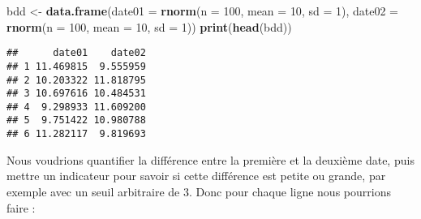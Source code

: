 \documentclass[]{book}
\newenvironment{Shaded}{\begin{snugshade}}{\end{snugshade}}
\newcommand{\KeywordTok}[1]{\textcolor[rgb]{0.13,0.29,0.53}{\textbf{#1}}}
\newcommand{\DataTypeTok}[1]{\textcolor[rgb]{0.13,0.29,0.53}{#1}}
\newcommand{\DecValTok}[1]{\textcolor[rgb]{0.00,0.00,0.81}{#1}}
\newcommand{\StringTok}[1]{\textcolor[rgb]{0.31,0.60,0.02}{#1}}
\newcommand{\NormalTok}[1]{#1}
\theoremstyle{definition}
\theoremstyle{definition}
\theoremstyle{definition}
\theoremstyle{remark}
\begin{document}
\begin{Shaded}
\begin{Highlighting}[]
\NormalTok{bdd <-}\StringTok{ }\KeywordTok{data.frame}\NormalTok{(}\DataTypeTok{date01 =} \KeywordTok{rnorm}\NormalTok{(}\DataTypeTok{n =} \DecValTok{100}\NormalTok{, }\DataTypeTok{mean =} \DecValTok{10}\NormalTok{, }\DataTypeTok{sd =} \DecValTok{1}\NormalTok{), }
                  \DataTypeTok{date02 =} \KeywordTok{rnorm}\NormalTok{(}\DataTypeTok{n =} \DecValTok{100}\NormalTok{, }\DataTypeTok{mean =} \DecValTok{10}\NormalTok{, }\DataTypeTok{sd =} \DecValTok{1}\NormalTok{))}
\KeywordTok{print}\NormalTok{(}\KeywordTok{head}\NormalTok{(bdd))}
\end{Highlighting}
\end{Shaded}

\begin{verbatim}
##      date01    date02
## 1 11.469815  9.555959
## 2 10.203322 11.818795
## 3 10.697616 10.484531
## 4  9.298933 11.609200
## 5  9.751422 10.980788
## 6 11.282117  9.819693
\end{verbatim}

Nous voudrions quantifier la différence entre la première et la deuxième
date, puis mettre un indicateur pour savoir si cette différence est
petite ou grande, par exemple avec un seuil arbitraire de 3. Donc pour
chaque ligne nous pourrions faire :
\end{document}
